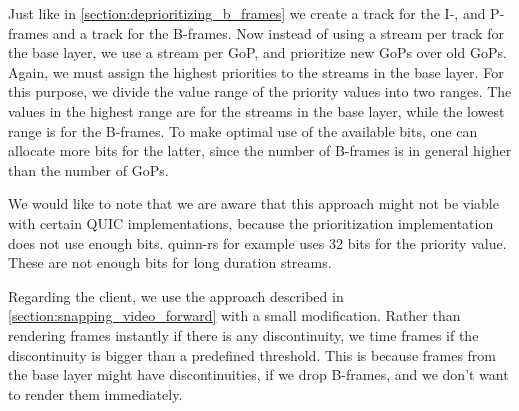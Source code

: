 Just like in \autoref{section:deprioritizing_b_frames} we create a track for the I-, and P-frames and a track for the B-frames. Now instead of using a stream per track for the base layer, we use a stream per GoP, and prioritize new GoPs over old GoPs. Again, we must assign the highest priorities to the streams in the base layer. For this purpose, we divide the value range of the priority values into two ranges. The values in the highest range are for the streams in the base layer, while the lowest range is for the B-frames. To make optimal use of the available bits, one can allocate more bits for the latter, since the number of B-frames is in general higher than the number of GoPs.

We would like to note that we are aware that this approach might not be viable with certain QUIC implementations, because the prioritization implementation does not use enough bits. quinn-rs for example uses 32 bits for the priority value. These are not enough bits for long duration streams. %

Regarding the client, we use the approach described in \ref{section:snapping_video_forward} with a small modification. Rather than rendering frames instantly if there is any discontinuity, we time frames if the discontinuity is bigger than a predefined threshold. This is because frames from the base layer might have discontinuities, if we drop B-frames, and we don't want to render them immediately. %
